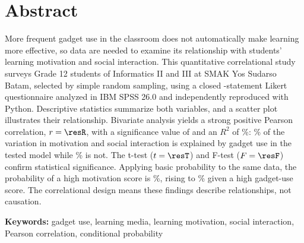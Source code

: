 \section*{Abstract}

\singlespacing

More frequent gadget use in the classroom does not automatically make
learning more effective, so data are needed to examine its relationship
with students' learning motivation and social interaction. This
quantitative correlational study surveys \resN{} Grade 12 students of
Informatics II and III at SMAK Yos Sudarso Batam, selected by simple
random sampling, using a closed \resNItems-statement Likert questionnaire
analyzed in IBM SPSS 26.0 and independently reproduced with Python. Descriptive statistics summarize both
variables, and a scatter plot illustrates their relationship. Bivariate
analysis yields a strong positive Pearson correlation, $r = \resR$, with
a significance value of \resSig{} and an $R^2$ of \resRSquaredPct\%:
\resRSquaredPct\% of the
variation in motivation and social interaction is explained by gadget use
in the tested model while \resUnexplainedPct\% is not. The t-test
($t = \resT$) and
F-test ($F = \resF$) confirm statistical significance. Applying basic
probability to the same data, the probability of a high motivation score
is \resPB\%, rising to \resPBGivenA\% given a high gadget-use score. The
correlational design means these findings describe relationships, not
causation.

\noindent\textbf{Keywords:} gadget use, learning media, learning
motivation, social interaction, Pearson correlation, conditional
probability
